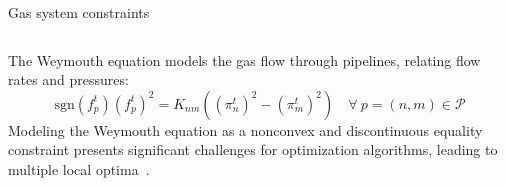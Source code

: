 \documentclass[hyperref={colorlinks,citecolor=blue,linkcolor=blue,urlcolor=blue}]{beamer}
\begin{document}
\begin{frame}{Gas system constraints}
\begin{columns}
\begin{column}{0.8\textwidth}
\end{column}
\end{columns}

The Weymouth equation models the gas flow through pipelines, relating flow rates and pressures:
    \begin{equation}
        \text{sgn}(f_{p}^t)(f_{p}^t)^2 = K_{nm}((\pi_{n}^t)^2 - (\pi_{m}^t)^2) \quad \forall \ p =(n,m) \in \mathcal{P}
    \end{equation}
Modeling the Weymouth equation as a nonconvex and discontinuous equality constraint presents significant challenges for optimization algorithms, leading to multiple local optima~\cite{JIANG2021106460}.

\end{frame}
%




%
%
%
\end{document}
